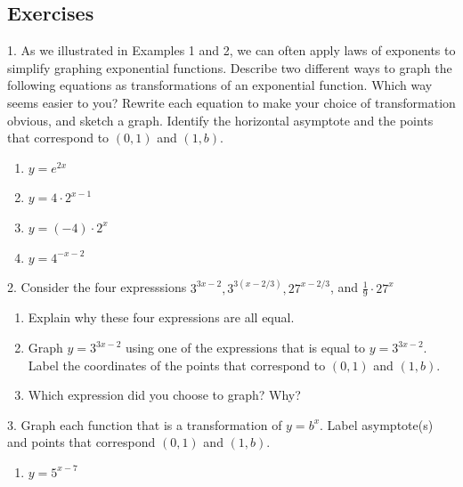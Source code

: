 \documentclass[10pt,]{book}
\theoremstyle{plain}
\theoremstyle{definition}
\theoremstyle{definition}
\theoremstyle{definition}
\numberwithin{equation}{section}
\begin{document}
\subsection[{Exercises}]{Exercises}\label{exercises-10}
\begin{exerciselist}
\item[1.]\hypertarget{exercise-62}{}\hypertarget{p-258}{}%
As we illustrated in Examples 1 and 2, we can often apply laws of exponents to simplify graphing exponential functions. Describe two different ways to graph the following equations as transformations of an exponential function.  Which way seems easier to you?  Rewrite each equation to make your choice of transformation obvious, and sketch a graph.  Identify the horizontal asymptote and the points that correspond to \((0,1)\) and \((1,b)\).%
\leavevmode%
\begin{enumerate}[label=(\alph*)]
\item\hypertarget{li-121}{}\(y=e^{2x}\)%
\item\hypertarget{li-122}{}\(y = 4 \cdot 2^{x-1}\)%
\item\hypertarget{li-123}{}\(y = (-4) \cdot 2^x\)%
\item\hypertarget{li-124}{}\(y = 4^{-x-2}\)%
\end{enumerate}
\par\smallskip
\item[2.]\hypertarget{exercise-63}{}\hypertarget{p-259}{}%
Consider the four expresssions \(3^{3x-2}, 3^{3(x-2/3)}, 27^{x-2/3}\), and \(\frac{1}{9} \cdot 27^x\)%
\leavevmode%
\begin{enumerate}[label=(\alph*)]
\item\hypertarget{li-125}{}Explain why these four expressions are all equal.%
\item\hypertarget{li-126}{}Graph \(y=3^{3x-2}\) using one of the expressions that is equal to \(y=3^{3x-2}\). Label the coordinates of the points that correspond to \((0, 1)\) and \((1, b)\).%
\item\hypertarget{li-127}{}Which expression did  you choose to graph?  Why?%
\end{enumerate}
\par\smallskip
\item[3.]\hypertarget{exercise-64}{}\hypertarget{p-260}{}%
Graph each function that is a transformation of \(y=b^x\). Label asymptote(s) and points that correspond \((0, 1)\) and \((1, b)\).%
\leavevmode%
\begin{enumerate}[label=(\alph*)]
\item\hypertarget{li-128}{}\(y=5^{x-7}\)%

\end{enumerate}
\end{exerciselist}
\end{document}
